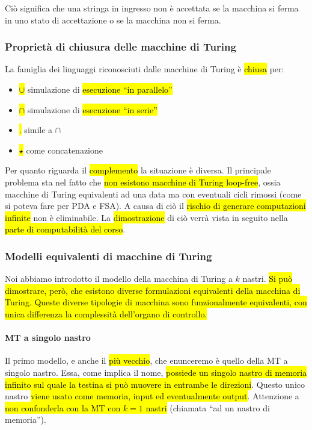 \documentclass[a4paper,11pt,oneside]{article}
\theoremstyle{plain}
\theoremstyle{definition}
\theoremstyle{remark}
\begin{document}
Ciò significa che una stringa in ingresso non è accettata se la macchina si
ferma in uno stato di accettazione o se la macchina non si ferma.

\subsubsection{Proprietà di chiusura delle macchine di Turing}\label{sec:analisi-mt}

La famiglia dei linguaggi riconosciuti dalle macchine di Turing è \hl{chiusa}
per:

\begin{itemize}
  \item \hl{$\cup$} simulazione di \hl{esecuzione ``in parallelo''}
  \item \hl{$\cap$} simulazione di \hl{esecuzione ``in serie''}
  \item \hl{$ . $} simile a $\cap$
  \item \hl{$\star$} come concatenazione
\end{itemize}

Per quanto riguarda il \hl{complemento} la situazione è diversa. Il principale
problema sta nel fatto che \hl{non esistono macchine di Turing loop-free}, ossia
macchine di Turing equivalenti ad una data ma con eventuali cicli rimossi (come
si poteva fare per PDA e FSA). A causa di ciò il \hl{rischio di generare
computazioni infinite} non è eliminabile. La \hl{dimostrazione} di ciò verrà
vista in seguito nella \hl{parte di computabilità del corso}.

\subsubsection{Modelli equivalenti di macchine di Turing}\label{sec:modelli-mt}

Noi abbiamo introdotto il modello della macchina di Turing a $k$ nastri. \hl{Si
può dimostrare, però, che esistono diverse formulazioni equivalenti della
macchina di Turing. Queste diverse tipologie di macchina sono funzionalmente
equivalenti, con unica differenza la complessità dell'organo di controllo.}

\paragraph{MT a singolo nastro} Il primo modello, e anche il \hl{più
vecchio}, che enunceremo è quello della MT a singolo nastro. Essa, come implica
il nome, \hl{possiede un singolo nastro di memoria infinito sul quale la testina
si può muovere in entrambe le direzioni}. Questo unico nastro \hl{viene usato
come memoria, input ed eventualmente output}. Attenzione a \hl{non confonderla
con la MT con $k=1$ nastri} (chiamata ``ad un nastro di memoria'').
\end{document}
